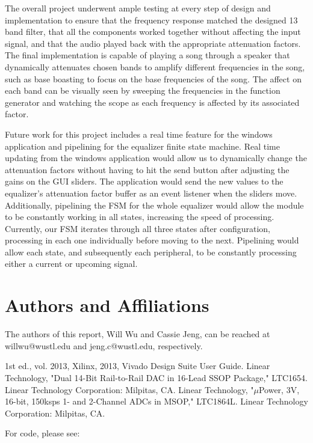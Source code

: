 \documentclass[journal]{IEEEtran} %
\begin{document}
The overall project underwent ample testing at every step of design and implementation to ensure that the frequency response matched the designed 13 band filter, that all the components worked together without affecting the input signal, and that the audio played back with the appropriate attenuation factors. The final implementation is capable of playing a song through a speaker that dynamically attenuates chosen bands to amplify different frequencies in the song, such as base boasting to focus on the base frequencies of the song. The affect on each band can be visually seen by sweeping the frequencies in the function generator and watching the scope as each frequency is affected by its associated factor.

Future work for this project includes a real time feature for the windows application and pipelining for the equalizer finite state machine. Real time updating from the windows application would allow us to dynamically change the attenuation factors without having to hit the send button after adjusting the gains on the GUI sliders. The application would send the new values to the equalizer's attenuation factor buffer as an event listener when the sliders move. Additionally, pipelining the FSM for the whole equalizer would allow the module to be constantly working in all states, increasing the speed of processing. Currently, our FSM iterates through all three states after configuration, processing in each one individually before moving to the next. Pipelining would allow each state, and subsequently each peripheral, to be constantly processing either a current or upcoming signal.

\section*{Authors and Affiliations}\label{sec:authors}
The authors of this report, Will Wu and Cassie Jeng, can be reached at willwu@wustl.edu and jeng.c@wustl.edu, respectively.

\begin{thebibliography}{00}
     1st ed., vol. 2013, Xilinx, 2013, Vivado Design Suite User Guide.
     Linear Technology, "Dual 14-Bit Rail-to-Rail DAC in 16-Lead SSOP Package," LTC1654. Linear Technology Corporation: Milpitas, CA.
     Linear Technology, "$\mu$Power, 3V, 16-bit, 150ksps 1- and 2-Channel ADCs in MSOP," LTC1864L. Linear Technology Corporation: Milpitas, CA.
\end{thebibliography}

\newpage
\onecolumn
For code, please see:
\end{document}

